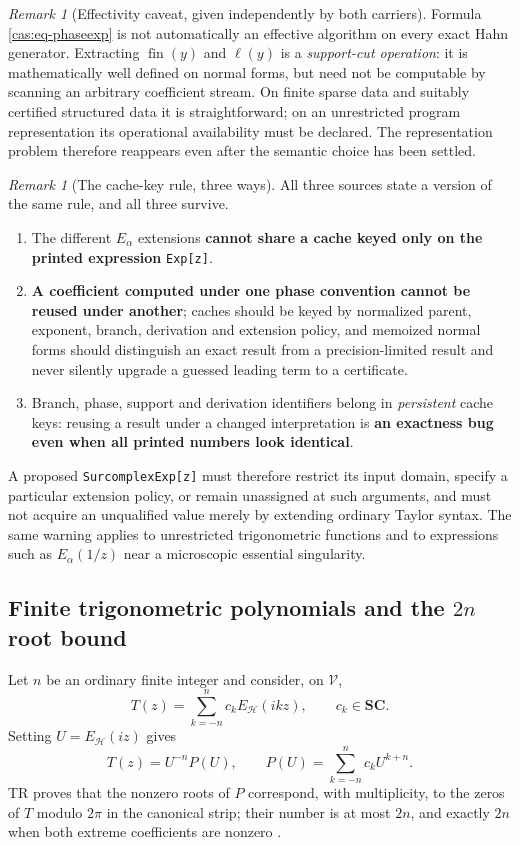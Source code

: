 \documentclass[11pt,letterpaper]{article}
\numberwithin{equation}{section}
\theoremstyle{definition}
\theoremstyle{remark}
\newtheorem{remark}[theorem]{Remark}
\newcommand{\SC}{\mathbf{SC}}
\newcommand{\HH}{\mathscr H}
\newcommand{\fin}{\operatorname{fin}}
\begin{document}
\begin{remark}[Effectivity caveat, given independently by both carriers]
\label{cas:rem-phaseeffectivity}
Formula \eqref{cas:eq-phaseexp} is not automatically an effective algorithm on
every exact Hahn generator. Extracting $\fin(y)$ and $\ell(y)$ is a
\emph{support-cut operation}: it is mathematically well defined on normal forms,
but need not be computable by scanning an arbitrary coefficient stream. On
finite sparse data and suitably certified structured data it is
straightforward; on an unrestricted program representation its operational
availability must be declared. The representation problem therefore reappears
even after the semantic choice has been settled.
\end{remark}

\begin{remark}[The cache-key rule, three ways]\label{cas:rem-cachekey}
All three sources state a version of the same rule, and all three survive.
\begin{enumerate}
\item The different $E_\alpha$ extensions \textbf{cannot share a cache keyed
only on the printed expression} \texttt{Exp[z]}.
\item \textbf{A coefficient computed under one phase convention cannot be
reused under another}; caches should be keyed by normalized parent, exponent,
branch, derivation and extension policy, and memoized normal forms should
distinguish an exact result from a precision-limited result and never silently
upgrade a guessed leading term to a certificate.
\item Branch, phase, support and derivation identifiers belong in
\emph{persistent} cache keys: reusing a result under a changed interpretation is
\textbf{an exactness bug even when all printed numbers look identical}.
\end{enumerate}
A proposed \texttt{SurcomplexExp[z]} must therefore restrict its input domain,
specify a particular extension policy, or remain unassigned at such arguments,
and must not acquire an unqualified value merely by extending ordinary Taylor
syntax. The same warning applies to unrestricted trigonometric functions and to
expressions such as $E_\alpha(1/z)$ near a microscopic essential singularity.
\end{remark}

\subsection{Finite trigonometric polynomials and the \texorpdfstring{$2n$}{2n} root bound}
\label{cas:sub-trigpoly}
Let $n$ be an ordinary finite integer and consider, on $\mathscr V$,
\[
 T(z)=\sum_{k=-n}^{n}c_kE_{\HH}(ikz),\qquad c_k\in\SC .
\]
Setting $U=E_{\HH}(iz)$ gives
\begin{equation}\label{cas:eq-trigalgebra}
 T(z)=U^{-n}P(U),\qquad P(U)=\sum_{k=-n}^{n}c_kU^{k+n}.
\end{equation}
TR proves that the nonzero roots of $P$ correspond, with multiplicity, to the
zeros of $T$ modulo $2\pi$ in the canonical strip; their number is at most $2n$,
and exactly $2n$ when both extreme coefficients are nonzero
\cite{cas:SourceTrig}.
\end{document}
